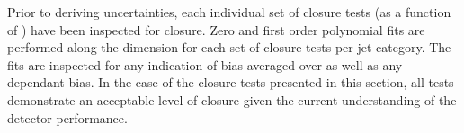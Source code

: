 Prior to deriving uncertainties, each individual set of closure tests
(as a function of \scalht) have been inspected for closure. Zero and
first order polynomial fits are performed along the \scalht dimension
for each set of closure tests per jet category. The fits are inspected
for any indication of bias averaged over \scalht as well as any
\scalht-dependant bias. In the case of the closure tests presented in
this section, all tests demonstrate an acceptable level of closure
given the current understanding of the detector performance. 


